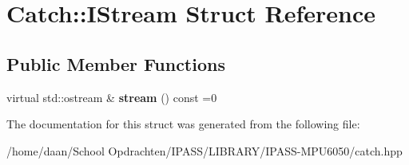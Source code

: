 \hypertarget{structCatch_1_1IStream}{}\section{Catch\+:\+:I\+Stream Struct Reference}
\label{structCatch_1_1IStream}
\subsection*{Public Member Functions}
\begin{DoxyCompactItemize}
\item 
\mbox{\label{structCatch_1_1IStream_a55a9ddbe250261ff38642f480ebdd902}} 
virtual std\+::ostream \& {\bfseries stream} () const =0
\end{DoxyCompactItemize}


The documentation for this struct was generated from the following file\+:\begin{DoxyCompactItemize}
\item 
/home/daan/\+School Opdrachten/\+I\+P\+A\+S\+S/\+L\+I\+B\+R\+A\+R\+Y/\+I\+P\+A\+S\+S-\/\+M\+P\+U6050/catch.\+hpp\end{DoxyCompactItemize}
